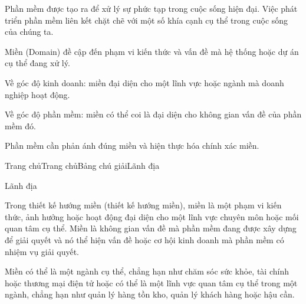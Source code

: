 Phần mềm được tạo ra để xử lý sự phức tạp trong cuộc sống hiện đại. Việc phát triển phần mềm liên kết chặt chẽ với một số khía cạnh cụ thể trong cuộc sống của chúng ta.

Miền (Domain) đề cập đến phạm vi kiến thức và vấn đề mà hệ thống hoặc dự án cụ thể đang xử lý.

Về góc độ kinh doanh: miền đại diện cho một lĩnh vực hoặc ngành mà doanh nghiệp hoạt động.

Về góc độ phần mềm: miền có thể coi là đại diện cho không gian vấn đề của phần mềm đó.

Phần mềm cần phản ánh đúng miền và hiện thực hóa chính xác miền.











Trang chủTrang chủBảng chú giảiLãnh địa

Lãnh địa

Trong thiết kế hướng miền (thiết kế hướng miền), miền là một phạm vi kiến thức, ảnh hưởng hoặc hoạt động đại diện cho một lĩnh vực chuyên môn hoặc mối quan tâm cụ thể. Miền là không gian vấn đề mà phần mềm đang được xây dựng để giải quyết và nó thể hiện vấn đề hoặc cơ hội kinh doanh mà phần mềm có nhiệm vụ giải quyết.

Miền có thể là một ngành cụ thể, chẳng hạn như chăm sóc sức khỏe, tài chính hoặc thương mại điện tử hoặc có thể là một lĩnh vực quan tâm cụ thể trong một ngành, chẳng hạn như quản lý hàng tồn kho, quản lý khách hàng hoặc hậu cần.

